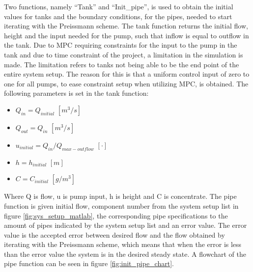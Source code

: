 Two functions, namely ``Tank'' and ``Init\_pipe'', is used to obtain the initial values for tanks and the boundary conditions, for the pipes, needed to start iterating with the Preissmann scheme. The tank function returns the initial flow, height and the input needed for the pump, such that inflow is equal to outflow in the tank. Due to MPC requiring constraints for the input to the pump in the tank and due to time constraint of the project, a limitation in the simulation is made. The limitation refers to tanks not being able to be the end point of the entire system setup. The reason for this is that a uniform control input of zero to one for all pumps, to ease constraint setup when utilizing MPC, is obtained. The following parameters is set in the tank function:
\begin{itemize}
	\item $Q_{in} = Q_{initial}$ $[m^3/s]$
	\item $Q_{out} = Q_{in}$ $[m^3/s]$
	\item $u_{initial} = Q_{in}/Q_{max-outflow}$ $[\cdot]$
	\item $h = h_{initial}$ $[m]$
	\item $C = C_{initial}$ $[g/m^3]$
\end{itemize}

Where Q is flow, u is pump input, h is height and C is concentrate.
The pipe function is given initial flow, component number from the system setup list in figure \ref{fig:sys_setup_matlab}, the corresponding pipe specifications to the amount of pipes indicated by the system setup list and an error value. The error value is the accepted error between desired flow and the flow obtained by iterating with the Preissmann scheme, which means that when the error is less than the error value the system is in the desired steady state. A flowchart of the pipe function can be seen in figure \ref{fig:init_pipe_chart}. 

